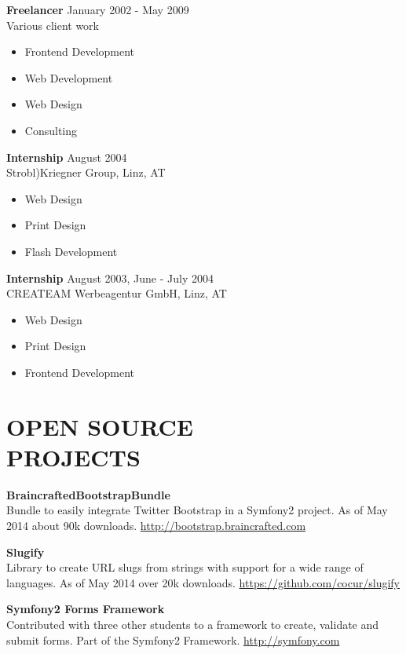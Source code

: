 \documentclass[margin]{res}
\begin{document}
\begin{resume}
\textbf{Freelancer} \hfill January 2002 - May 2009 \\
	Various client work
	\begin{itemize}  \itemsep -2pt
		\item Frontend Development
		\item Web Development
		\item Web Design
		\item Consulting
	\end{itemize}

\textbf{Internship} \hfill August 2004 \\
	Strobl)Kriegner Group, Linz, AT
	\begin{itemize}  \itemsep -2pt
		\item Web Design
		\item Print Design
		\item Flash Development
	\end{itemize}

\textbf{Internship} \hfill August 2003, June - July 2004 \\
	CREATEAM Werbeagentur GmbH, Linz, AT
	\begin{itemize}  \itemsep -2pt
		\item Web Design
		\item Print Design
		\item Frontend Development
	\end{itemize}

\clearpage

\section{OPEN SOURCE \\ PROJECTS}

\textbf{BraincraftedBootstrapBundle} \\
	Bundle to easily integrate Twitter Bootstrap in a Symfony2 project. As of May 2014 about 90k downloads. \url{http://bootstrap.braincrafted.com}

\textbf{Slugify} \\
	Library to create URL slugs from strings with support for a wide range of languages. As of May 2014 over 20k downloads. \url{https://github.com/cocur/slugify}

\textbf{Symfony2 Forms Framework} \\
	Contributed with three other students to a framework to create, validate and submit forms. Part of the Symfony2 Framework. \url{http://symfony.com}


\end{resume}
\end{document}
